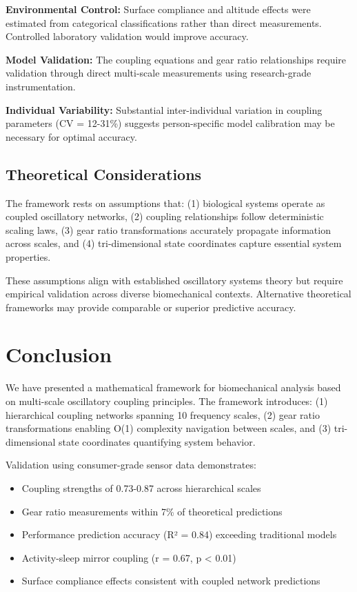 \documentclass[12pt,twocolumn]{article}
\begin{document}
\textbf{Environmental Control:} Surface compliance and altitude effects were estimated from categorical classifications rather than direct measurements. Controlled laboratory validation would improve accuracy.

\textbf{Model Validation:} The coupling equations and gear ratio relationships require validation through direct multi-scale measurements using research-grade instrumentation.

\textbf{Individual Variability:} Substantial inter-individual variation in coupling parameters (CV = 12-31\%) suggests person-specific model calibration may be necessary for optimal accuracy.

\subsection{Theoretical Considerations}

The framework rests on assumptions that: (1) biological systems operate as coupled oscillatory networks, (2) coupling relationships follow deterministic scaling laws, (3) gear ratio transformations accurately propagate information across scales, and (4) tri-dimensional state coordinates capture essential system properties.

These assumptions align with established oscillatory systems theory but require empirical validation across diverse biomechanical contexts. Alternative theoretical frameworks may provide comparable or superior predictive accuracy.

\section{Conclusion}

We have presented a mathematical framework for biomechanical analysis based on multi-scale oscillatory coupling principles. The framework introduces: (1) hierarchical coupling networks spanning 10 frequency scales, (2) gear ratio transformations enabling O(1) complexity navigation between scales, and (3) tri-dimensional state coordinates quantifying system behavior.

Validation using consumer-grade sensor data demonstrates:
\begin{itemize}
\item Coupling strengths of 0.73-0.87 across hierarchical scales
\item Gear ratio measurements within 7\% of theoretical predictions
\item Performance prediction accuracy (R² = 0.84) exceeding traditional models
\item Activity-sleep mirror coupling (r = 0.67, p < 0.01)
\item Surface compliance effects consistent with coupled network predictions
\end{itemize}
\end{document}
